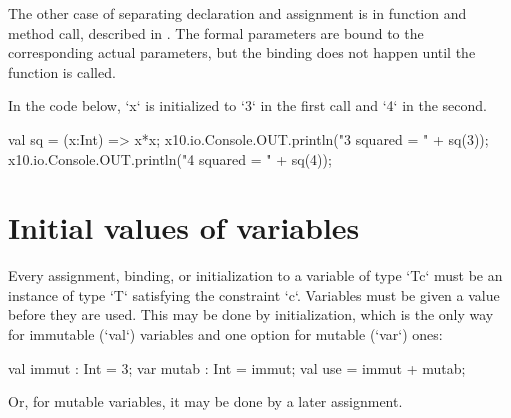 The other case of separating declaration and assignment is in function
and method call, described in .  The formal
parameters are bound to the corresponding actual 
parameters, but the binding does not happen until the function is called.  

\begin{ex}
In
the code below, \xcd`x` is initialized to \xcd`3` in the first call and
\xcd`4` in the second.
\begin{xten}
val sq = (x:Int) => x*x;
x10.io.Console.OUT.println("3 squared = " + sq(3));
x10.io.Console.OUT.println("4 squared = " + sq(4));
\end{xten}
\end{ex}





\section{Initial values of variables}
\label{NullaryConstructor}


Every assignment, binding, or initialization to a variable of type \xcd`T{c}`
must be an instance of type \xcd`T` satisfying the constraint \xcd`{c}`.
Variables must be given a value before they are used. This may be done by
initialization, which is the only way for immutable (\xcd`val`) variables and
one option for mutable (\xcd`var`) ones: 

\begin{xten}
  val immut : Int = 3;
  var mutab : Int = immut;
  val use = immut + mutab;
\end{xten}
Or, for mutable variables, it may be done by a later assignment.  

